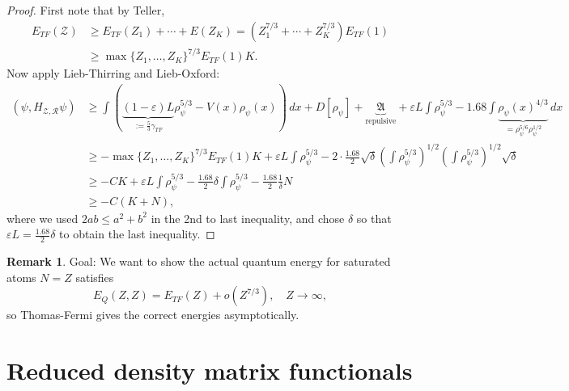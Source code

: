 \documentclass[11pt]{amsart}
\theoremstyle{definition}
\theoremstyle{definition}
\theoremstyle{definition}
\newtheorem*{rmk}{Remark}
\numberwithin{equation}{section}
\begin{document}
\begin{proof}
First note that by Teller,
\begin{align*}
E_{TF}(\mathcal{Z})&\ge E_{TF}(Z_1)+\cdots+E(Z_K)=(Z_1^{7/3}+\cdots+Z_K^{7/3})E_{TF}(1)\\
&\ge\max\{Z_1,\ldots,Z_K\}^{7/3}E_{TF}(1)K.
\end{align*}
Now apply Lieb-Thirring and Lieb-Oxford:
\begin{align*}
(\psi,H_{\mathcal{Z},\mathcal{R}}\psi)&\ge \int(\underbrace{(1-\varepsilon)L}_{:=\frac{5}{3}\gamma_{TF}}\rho_\psi^{5/3}-V(x)\rho_\psi(x))\,dx+D[\rho_\psi]+\underbrace{\mathfrak{A}}_{\text{repulsive}}+\varepsilon L\int \rho_\psi^{5/3}-1.68\int\underbrace{\rho_\psi(x)^{4/3}}_{=\rho_\psi^{5/6}\rho_\psi^{1/2}}\,dx\\
&\ge -\max\{Z_1,\ldots,Z_K\}^{7/3}E_{TF}(1)K+\varepsilon L\int \rho_\psi^{5/3}-2\cdot\frac{1.68}{2}\sqrt{\delta}\left(\int \rho_\psi^{5/3}\right)^{1/2}\left(\int\rho_\psi^{5/3}\right)^{1/2}\sqrt{\delta}\\
&\ge -CK+\varepsilon L\int\rho_\psi^{5/3}-\frac{1.68}{2}\delta \int\rho_\psi^{5/3}-\frac{1.68}{2}\frac{1}{\delta}N\\
&\ge -C(K+N),
\end{align*}
where we used $2ab\le a^2+b^2$ in the 2nd to last inequality, and chose $\delta$ so that $\varepsilon L=\frac{1.68}{2}\delta$ to obtain the last inequality.
\end{proof}


\begin{rmk}
Goal: We want to show the actual quantum energy for saturated atoms $N=Z$ satisfies
\begin{equation}
E_Q(Z,Z)=E_{TF}(Z)+o(Z^{7/3}),\quad Z\to\infty,
\end{equation}
so Thomas-Fermi gives the correct energies asymptotically.
\end{rmk}

\section{Reduced density matrix functionals}
\end{document}
